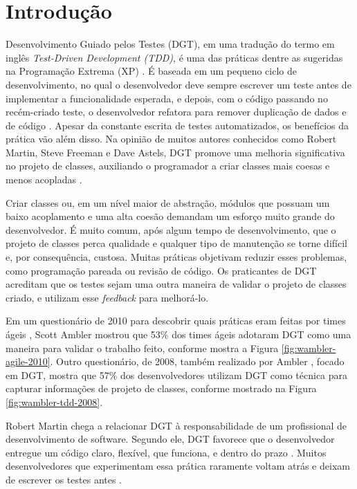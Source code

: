 \chapter{Introdução}
\label{cap:introducao}

Desenvolvimento Guiado pelos Testes (DGT), em uma tradução do termo
em inglês \textit{Test-Driven Development (TDD)},
é uma das práticas dentre as sugeridas na Programação
Extrema (XP) \cite{XPExplained}. É baseada em um pequeno ciclo de
desenvolvimento, no qual o desenvolvedor deve sempre escrever um teste antes
de implementar a funcionalidade esperada, e depois, com o código
passando no recém-criado teste, o desenvolvedor refatora para 
remover duplicação de dados e de código \cite{TDDByExample}.
Apesar da constante escrita de testes automatizados, os benefícios da
prática vão além disso. Na opinião de muitos autores conhecidos como Robert Martin,
Steve Freeman e Dave Astels, DGT promove
uma melhoria significativa no projeto de classes, auxiliando o programador a
criar classes mais coesas e menos acopladas \cite{TDDByExample} \cite{GOOS} 
\cite{astels-tdd}.

Criar classes ou, em um nível maior de abstração, módulos que possuam um baixo
acoplamento e uma alta coesão demandam um esforço muito grande do desenvolvedor. 
É muito comum, após algum tempo de desenvolvimento, que o projeto de classes perca qualidade
e qualquer tipo de manutenção se torne difícil e, por consequência, custosa.
Muitas práticas objetivam reduzir esses problemas, como programação pareada ou
revisão de código. Os praticantes de DGT acreditam que os testes sejam uma outra
maneira de validar o projeto de classes criado, e utilizam esse \textit{feedback} para melhorá-lo.

Em um questionário de 2010 para descobrir quais práticas eram feitas por times
ágeis \cite{wambler-survey-agile}, Scott Ambler mostrou que 53\% dos times ágeis
adotaram DGT como uma maneira para validar o trabalho feito, conforme mostra a 
Figura \ref{fig:wambler-agile-2010}. Outro questionário, de 2008, também realizado por Ambler
\cite{wambler-survey-tdd}, focado em DGT, mostra que 57\% dos desenvolvedores 
utilizam DGT como técnica para capturar informações de projeto de classes, conforme mostrado
na Figura \ref{fig:wambler-tdd-2008}.

Robert Martin chega a relacionar DGT à responsabilidade de um 
profissional de desenvolvimento de software. 
Segundo ele, DGT favorece que o desenvolvedor entregue um 
código claro, flexível, que funciona, e dentro do prazo \cite{martin-profissionalismo}.
Muitos desenvolvedores que experimentam essa prática raramente voltam atrás e deixam
de escrever os testes antes \cite{tdd-fearless}. 

